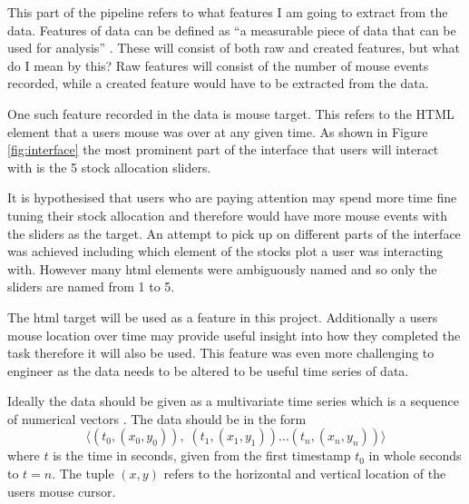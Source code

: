 \documentclass{article}
\begin{document}


This part of the pipeline refers to what features I am going to extract from the data.
Features of data can be defined as ``a measurable piece of data that can be used for analysis'' \cite{DataRobot}.
These will consist of both raw and created features, but what do I mean by this?
Raw features will consist of the number of mouse events recorded, while a created feature would have to be extracted from the data.

One such feature recorded in the data is mouse target.
This refers to the HTML element that a users mouse was over at any given time.
As shown in Figure \ref{fig:interface} the most prominent part of the interface that users will interact with is the 5 stock allocation sliders.

It is hypothesised that users who are paying attention may spend more time fine tuning their stock allocation and therefore would have more mouse events with the sliders as the target.
An attempt to pick up on different parts of the interface was achieved including which element of the stocks plot a user was interacting with.
However many html elements were ambiguously named and so only the sliders are named from 1 to 5.

The html target will be used as a feature in this project.
Additionally a users mouse location over time may provide useful insight into how they completed the task therefore it will also be used.
This feature was even more challenging to engineer as the data needs to be altered to be useful time series of data.

Ideally the data should be given as a multivariate time series which is a sequence of numerical vectors \cite{xing2010brief}.
The data should be in the form
\[    %
    \langle(t_0, (x_0, y_0)),\; (t_1, (x_1, y_1))\hdots (t_n, (x_n, y_n))\rangle 
\]
where $t$ is the time in seconds, given from the first timestamp $t_0$ in whole seconds to $t=n$.
The tuple $(x,y)$ refers to the horizontal and vertical location of the users mouse cursor.
\end{document}
